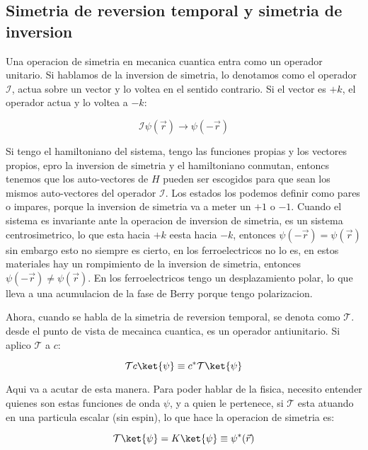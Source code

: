 \documentclass[11pt,fleqn]{book}
\begin{document}
\subsection{Simetria de reversion temporal y simetria de inversion}

Una operacion de simetria en mecanica cuantica entra como un operador unitario. Si hablamos de la inversion de simetria, lo denotamos como el operador $\mathcal{I}$, actua sobre un vector y lo voltea en el sentido contrario. Si el vector es $+k$, el operador actua y lo voltea a $-k$:

\begin{equation}
    \mathcal{I}\psi(\vec{r})\rightarrow\psi(-\vec{r})
\end{equation}

Si tengo el hamiltoniano del sistema, tengo las funciones propias y los vectores propios, epro la inversion de simetria y el hamiltoniano conmutan, entoncs tenemos que los auto-vectores de $H$ pueden ser escogidos para que sean los mismos auto-vectores del operador $\mathcal{I}$. Los estados los podemos definir como pares o impares, porque la inversion de simetria va a meter un $+1$ o $-1$. Cuando el sistema es invariante ante la operacion de inversion de simetria, es un sistema centrosimetrico, lo que esta hacia $+k$ eesta hacia $-k$, entonces $\psi(-\vec{r})=\psi(\vec{r})$ sin embargo esto no siempre es cierto, en los ferroelectricos no lo es, en estos materiales hay un rompimiento de la inversion de simetria, entonces $\psi(-\vec{r})\neq\psi(\vec{r})$. En los ferroelectricos tengo un desplazamiento polar, lo que lleva a una acumulacion de la fase de Berry porque tengo polarizacion. 

Ahora, cuando se habla de la simetria de reversion temporal, se denota como $\mathcal{T}$. desde el punto de vista de mecainca cuantica, es un operador antiunitario. Si aplico $\mathcal{T}$ a $c$:

\begin{equation}
    \mathcal{T}c\ket{\psi}\equiv c^{\ast}\mathcal{T}\ket{\psi}
\end{equation}

Aqui va a acutar de esta manera. Para poder hablar de la fisica, necesito entender quienes son estas funciones de onda $\psi$, y a quien le pertenece, si $\mathcal{T}$ esta atuando en una particula escalar (sin espin), lo que hace la operacion de simetria es:

\begin{equation}
    \mathcal{T}\ket{\psi}=K\ket{\psi}\equiv\psi^{\ast}(\vec{r})
\end{equation}
\end{document}
